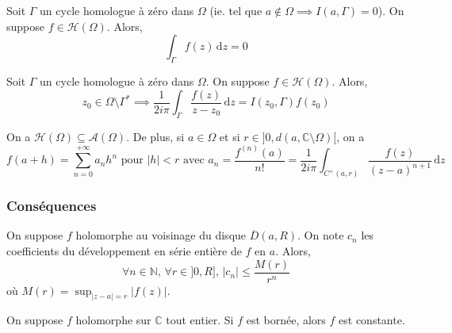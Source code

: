 
  \begin{theorem}
    Soit $\Gamma$ un cycle homologue à zéro dans $\Omega$ (ie. tel que $a \notin \Omega \implies I(a, \Gamma) = 0$). On suppose $f \in \mathcal{H}(\Omega)$. Alors,
    \[ \int_\Gamma f(z) \, \mathrm{d}z = 0 \]
  \end{theorem}

  \begin{corollary}
    Soit $\Gamma$ un cycle homologue à zéro dans $\Omega$. On suppose $f \in \mathcal{H}(\Omega)$. Alors,
    \[ z_0 \in \Omega \setminus \Gamma^* \implies \frac{1}{2i\pi} \int_\Gamma \frac{f(z)}{z-z_0} \, \mathrm{d}z = I(z_0, \Gamma) f(z_0) \]
  \end{corollary}


  \begin{corollary}
    On a $\mathcal{H}(\Omega) \subseteq \mathcal{A}(\Omega)$. De plus, si $a \in \Omega$ et si $r \in ]0, d(a,\mathbb{C}\setminus\Omega)[$, on a
    \[ f(a + h) = \sum_{n=0}^{+\infty} a_n h^n \text{ pour } \vert h \vert < r \text{ avec } a_n = \frac{f^{(n)}(a)}{n!} = \frac{1}{2i\pi} \int_{C^+(a,r)} \frac{f(z)}{(z-a)^{n+1}} \, \mathrm{d}z \]
  \end{corollary}

  \subsubsection{Conséquences}


  \begin{proposition}
    On suppose $f$ holomorphe au voisinage du disque $\overline{D}(a,R)$. On note $c_n$ les coefficients du développement en série entière de $f$ en $a$. Alors,
    \[ \forall n \in \mathbb{N}, \, \forall r \in ]0,R], \, \vert c_n \vert \leq \frac{M(r)}{r^n} \]
    où $M(r) = \sup_{\vert z-a \vert = r} \vert f(z) \vert$.
  \end{proposition}

  \begin{corollary}
    On suppose $f$ holomorphe sur $\mathbb{C}$ tout entier. Si $f$ est bornée, alors $f$ est constante.
  \end{corollary}


